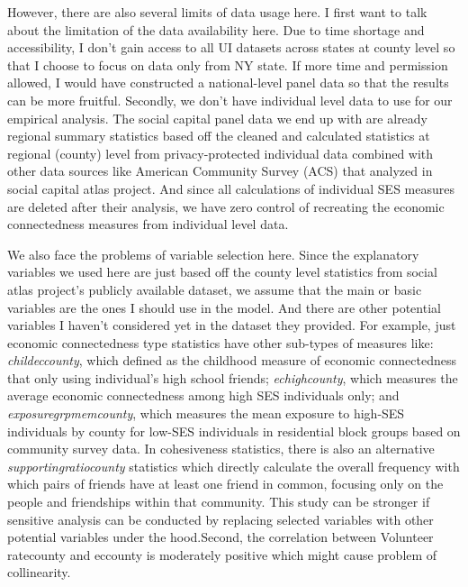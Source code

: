 \documentclass{article}
\begin{document}
However, there are also several limits of data usage here. I first want to talk about the limitation of the data availability here. Due to time shortage and accessibility, I don't gain access to all UI datasets across states at county level so that I choose to focus on data only from NY state. If more time and permission allowed, I would have constructed a national-level panel data so that the results can be more fruitful. Secondly, we don't have individual level data to use for our empirical analysis. The social capital panel data we end up with are already regional summary statistics based off the cleaned and calculated statistics at regional (county) level from privacy-protected individual data combined with other data sources like American Community Survey (ACS) that analyzed in social capital atlas project. And since all calculations of individual SES measures are deleted after their analysis, we have zero control of recreating the economic connectedness measures from individual level data.



We also face the problems of variable selection here. Since the explanatory variables we used here are just based off the county level statistics from social atlas project's publicly available dataset, we assume that the main or basic variables are the ones I should use in the model. And there are other potential variables I haven't considered yet in the dataset they provided. For example, just economic connectedness type statistics have other sub-types of measures like: \textit{child\textunderscore ec\textunderscore county}, which defined as the childhood measure of economic connectedness that only using individual's high school friends; \textit{ec\textunderscore high\textunderscore county}, which measures the average economic connectedness among high SES individuals only; and \textit{exposure\textunderscore grp\textunderscore mem\textunderscore county}, which measures the mean exposure to high-SES individuals by county for low-SES individuals in residential block groups based on community survey data. In cohesiveness statistics, there is also an alternative \textit{supporting\textunderscore ratio\textunderscore county} statistics which directly calculate the overall frequency with which pairs of friends have at least one friend in common, focusing only on the people and friendships within that community. This study can be stronger if sensitive analysis can be conducted by replacing selected variables with other potential variables under the hood.Second, the correlation between Volunteer \textunderscore rate\textunderscore county and ec\textunderscore county is moderately positive which might cause problem of collinearity. 
\end{document}
